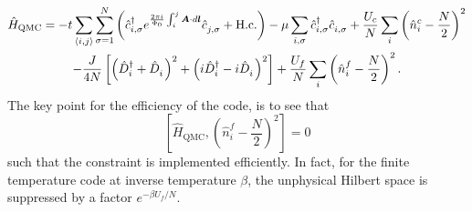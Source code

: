\begin{multline}
	\hat{H}_\textrm{QMC}     =    - t  \sum_{\langle i,j \rangle}    \sum_{\sigma=1}^{N}  \left(  \hat{c}^{\dagger}_{i,\sigma}  e^{\frac{2\pi i}{\Phi_0}  \int_{i}^{j} \ve{A}\cdot d \ve{l}}\hat{c}^{\phantom\dagger}_{j,\sigma}  + \hc \right)  - \mu \sum_{i,\sigma} \hat{c}^{\dagger}_{i,\sigma}  \hat{c}^{\phantom\dagger}_{i,\sigma} 
	+    \frac{U_c}{N}  \sum_{i}   \left( \hat{n}^c_i -  \frac{N}{2} \right)^2  \\
    -    \frac{J}{4N}    \left[ \left(   \hat{D}^{\dagger}_{i}  + \hat{D}^{\phantom\dagger}_{i}    \right)^{2}  + 
                                                       \left(  i\hat{D}^{\dagger}_{i}  - i  \hat{D}^{\phantom\dagger}_{i}    \right)^2  \right]  
       +    \frac{U_f}{N}  \sum_{i}   \left( \hat{n}^f_i -  \frac{N}{2} \right)^2.
\label{Kondo_SUN_Ham_QMC.eq}
\end{multline}
The key point for the efficiency of the code, is to  see that 
\begin{equation}
	\left[   \hat{H}_\textrm{QMC},  \left( \hat{n}^f_i -  \frac{N}{2} \right)^2  \right]    = 0 
\label{Constraint_KLM.eq}
\end{equation}
such that the  constraint is implemented  efficiently.  In fact, for the finite temperature code  at inverse temperature $\beta$,  the unphysical Hilbert space   is suppressed by a  
factor  $e^{- \beta U_f/N} $. 



